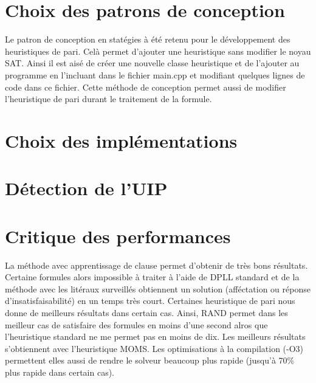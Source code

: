 \documentclass{article}
\begin{document}
\section{Choix des patrons de conception}
Le patron de conception en statégies à été retenu pour le développement des heuristiques de pari. Celà permet d'ajouter une heuristique sans modifier le noyau SAT. Ainsi il est aisé de créer une nouvelle classe heuristique et de l'ajouter au programme en l'incluant dans le fichier main.cpp et modifiant quelques lignes de code dans ce fichier.
Cette méthode de conception permet aussi de modifier l'heuristique de pari durant le traitement de la formule.

\section{Choix des implémentations}

\section{Détection de l'UIP}

\section{Critique des performances}
La méthode avec apprentissage de clause permet d'obtenir de très bons résultats. Certaine formules alors impossible à traiter à l'aide de DPLL standard et de la méthode avec les litéraux surveillés obtiennent un solution (afféctation ou réponse d'insatisfaisabilité) en un temps très court.
Certaines heuristique de pari nous donne de meilleurs résultats dans certain cas. Ainsi, RAND permet dans les meilleur cas de satisfaire des formules en moins d'une second alros que l'heuristique standard ne me permet pas en moins de dix. Les meilleurs résultats s'obtiennent avec l'heuristique MOMS.
Les optimisations à la compilation (-O3) permettent elles aussi de rendre le solveur beaucoup plus rapide (jusqu'à 70\% plus rapide dans certain cas).



\end{document}
